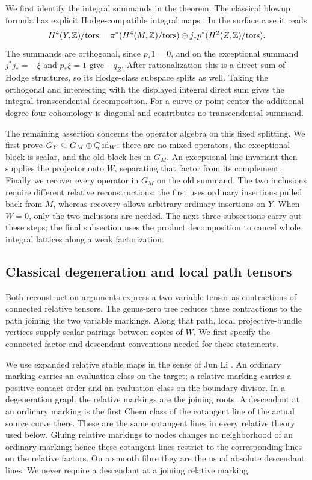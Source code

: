 We first identify the integral summands in the theorem. The classical
blowup formula has explicit Hodge-compatible integral maps
\cite[Section~2.1, Lemmas~9--10]{Schreieder14}. In the surface case it reads
\[
 H^4(Y,\mathbb Z)/\mathrm{tors}
 =\pi^*(H^4(M,\mathbb Z)/\mathrm{tors})
       \oplus j_*p^*(H^2(Z,\mathbb Z)/\mathrm{tors}).
\]
The summands are orthogonal, since $p_*1=0$, and on the exceptional summand
$j^*j_*=-\xi$ and $p_*\xi=1$ give $-q_Z$. After rationalization this is a
direct sum of Hodge structures, so its Hodge-class subspace splits as well.
Taking the orthogonal and intersecting with the displayed integral direct
sum gives the integral transcendental decomposition. For a curve or
point center the additional degree-four cohomology is diagonal and
contributes no transcendental summand.

The remaining assertion concerns the operator algebra on this fixed
splitting. We first prove
$G_Y\subseteq G_M\oplus\mathbb Q\operatorname{id}_W$: there are no mixed
operators, the exceptional block is scalar, and the old block lies in
$G_M$. An exceptional-line invariant then supplies the projector onto
$W$, separating that factor from its complement. Finally we recover
every operator in $G_M$ on the old summand. The two inclusions require
different relative reconstructions: the first uses ordinary insertions
pulled back from $M$, whereas recovery allows arbitrary ordinary
insertions on $Y$. When $W=0$, only the two inclusions are needed.
The next three subsections carry out these steps; the final subsection
uses the product decomposition to cancel whole integral lattices along
a weak factorization.

\subsection{Classical degeneration and local path tensors}

Both reconstruction arguments express a two-variable tensor as contractions
of connected relative tensors. The genus-zero tree reduces these
contractions to the path joining the two variable markings. Along that
path, local projective-bundle vertices supply scalar pairings between
copies of $W$. We first specify the connected-factor and descendant
conventions needed for these statements.

We use expanded relative stable maps in the sense of Jun Li
\cite{Li01,Li02}.  An ordinary marking carries an evaluation class on the
target; a relative marking carries a positive contact order and an
evaluation class on the boundary divisor.  In a degeneration graph the
relative markings are the joining roots.  A descendant at an ordinary marking is the first Chern
class of the cotangent line of the actual source curve there.  These are the
same cotangent lines in every relative theory used below.  Gluing relative
markings to nodes changes no neighborhood of an ordinary marking; hence
these cotangent lines restrict to the corresponding lines on the relative
factors.  On a smooth fibre they are the usual absolute descendant lines.
We never require a descendant at a joining relative marking.

